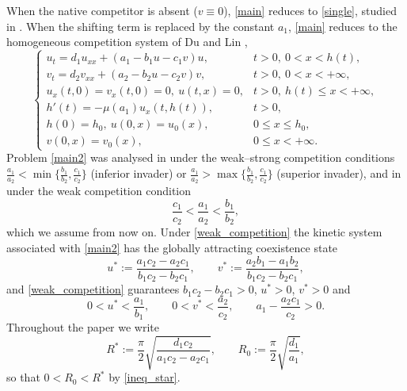\documentclass[reqno]{amsart}
\theoremstyle{plain}
\theoremstyle{definition}
\theoremstyle{remark}
\begin{document}
When the native competitor is absent ($v\equiv0$), \eqref{main} reduces to
\eqref{single}, studied in \cite{HU20205931}. When the shifting term is replaced
by the constant $a_1$, \eqref{main} reduces to the homogeneous competition system
of Du and Lin \cite{MR3327894},
\begin{equation}\label{main2}
	\begin{cases}
		u_t = d_1u_{xx} + (a_1 - b_1u - c_1 v) u, & t > 0,~ 0 < x < h(t), \\
		v_t = d_2v_{xx} + (a_2 - b_2u - c_2v)v, & t > 0,~ 0 < x < +\infty, \\
		u_x(t, 0) = v_x(t, 0) = 0, ~ u(t, x) = 0, & t > 0, ~ h(t) \leq x < +\infty, \\
		h'(t) = -\mu (a_1)u_x(t, h(t)), & t > 0, \\
		h(0)=h_0,~ u(0, x) = u_0(x), & 0 \leq x \leq h_0, \\
		v(0, x) = v_0(x), & 0 \le x < +\infty.
	\end{cases}
\end{equation}
Problem \eqref{main2} was analysed in \cite{MR3327894,MR3609207} under the
weak--strong competition conditions
$\frac{a_1}{a_2} < \min\{\frac{b_1}{b_2},\frac{c_1}{c_2}\}$ (inferior invader) or
$\frac{a_1}{a_2} > \max\{\frac{b_1}{b_2},\frac{c_1}{c_2}\}$ (superior invader),
and in \cite{MR3986328} under the weak competition condition
\begin{equation}\label{weak_competition}
	\frac{c_1}{c_2} < \frac{a_1}{a_2} < \frac{b_1}{b_2},
\end{equation}
which we assume from now on. Under \eqref{weak_competition} the kinetic system
associated with \eqref{main2} has the globally attracting coexistence state
\begin{equation}\label{coexist}
	u^* := \frac{a_1c_2-a_2c_1}{b_1c_2-b_2c_1},\qquad
	v^* := \frac{a_2b_1-a_1b_2}{b_1c_2-b_2c_1},
\end{equation}
and \eqref{weak_competition} guarantees $b_1c_2-b_2c_1>0$, $u^*>0$, $v^*>0$ and
\begin{equation}\label{ineq_star}
	0<u^*<\frac{a_1}{b_1},\qquad 0<v^*<\frac{a_2}{c_2},\qquad
	a_1-\frac{a_2c_1}{c_2}>0 .
\end{equation}
Throughout the paper we write
\begin{equation}\label{Rstar}
	R^*:=\frac{\pi}{2}\sqrt{\frac{d_1c_2}{a_1c_2-a_2c_1}},
	\qquad
	R_0:=\frac{\pi}{2}\sqrt{\frac{d_1}{a_1}},
\end{equation}
so that $0<R_0<R^*$ by \eqref{ineq_star}.
\end{document}
